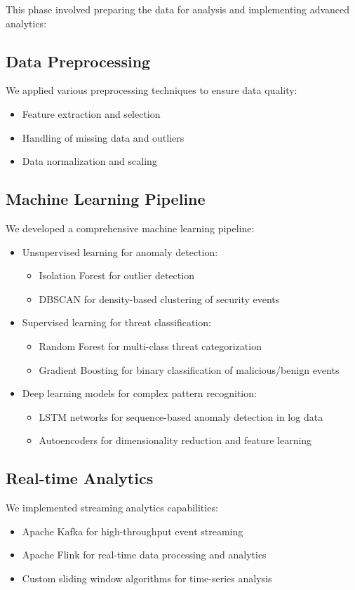 This phase involved preparing the data for analysis and implementing advanced analytics:

\subsection{Data Preprocessing}
We applied various preprocessing techniques to ensure data quality:
\begin{itemize}
    \item Feature extraction and selection
    \item Handling of missing data and outliers
    \item Data normalization and scaling
\end{itemize}

\subsection{Machine Learning Pipeline}
We developed a comprehensive machine learning pipeline:
\begin{itemize}
    \item Unsupervised learning for anomaly detection:
    \begin{itemize}
        \item Isolation Forest for outlier detection
        \item DBSCAN for density-based clustering of security events
    \end{itemize}
    \item Supervised learning for threat classification:
    \begin{itemize}
        \item Random Forest for multi-class threat categorization
        \item Gradient Boosting for binary classification of malicious/benign events
    \end{itemize}
    \item Deep learning models for complex pattern recognition:
    \begin{itemize}
        \item LSTM networks for sequence-based anomaly detection in log data
        \item Autoencoders for dimensionality reduction and feature learning
    \end{itemize}
\end{itemize}

\subsection{Real-time Analytics}
We implemented streaming analytics capabilities:
\begin{itemize}
    \item Apache Kafka for high-throughput event streaming
    \item Apache Flink for real-time data processing and analytics
    \item Custom sliding window algorithms for time-series analysis
\end{itemize}


